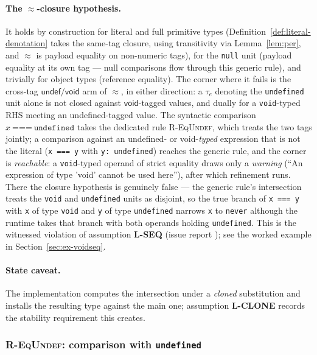 \documentclass[11pt]{article}
\begin{document}
\paragraph{The $\approx$-closure hypothesis.}
It holds by construction for literal and full primitive types
(Definition~\ref{def:literal-denotation} takes the same-tag closure, using
transitivity via Lemma~\ref{lem:per}, and $\approx$ is payload equality on
non-numeric tags), for the \texttt{null} unit (payload equality at its own
tag — null comparisons flow through this generic rule), and trivially for
object types (reference equality). The corner where it fails is the
cross-tag $\mathsf{undef}/\mathsf{void}$ arm of $\approx$, in either
direction: a $\tau_e$ denoting the \texttt{undefined} unit alone is not
closed against $\mathsf{void}$-tagged values, and dually for a
\texttt{void}-typed RHS meeting an undefined-tagged value. The syntactic
comparison
$x\ \texttt{===}\ \texttt{undefined}$ takes the dedicated rule
\textsc{R-EqUndef}, which treats the two tags jointly; a comparison against
an undefined- or void-\emph{typed} expression that is not the literal
(\texttt{x === y} with \texttt{y: undefined}) reaches the generic rule,
and the corner is \emph{reachable}: a \texttt{void}-typed operand of
strict equality draws only a \emph{warning} (``An expression of type
'void' cannot be used here''), after which refinement runs. There the
closure hypothesis is genuinely false — the generic rule's intersection
treats the \texttt{void} and \texttt{undefined} units as disjoint, so
the true branch of \texttt{x === y} with \texttt{x} of type
\texttt{void} and \texttt{y} of type \texttt{undefined} narrows
\texttt{x} to \texttt{never} although the runtime takes that branch with
both operands holding \texttt{undefined}. This is the witnessed
violation of assumption \textbf{L-SEQ} (issue report
); see the
worked example in Section~\ref{sec:ex-voidseq}.

\paragraph{State caveat.}
The implementation computes the intersection under a \emph{cloned}
substitution and installs the resulting type against the main one;
assumption \textbf{L-CLONE} records the stability requirement this
creates.

\subsubsection{\textsc{R-EqUndef}: comparison with \texttt{undefined}}
\end{document}

